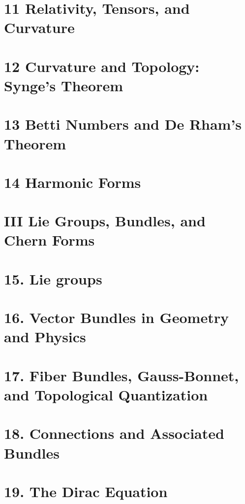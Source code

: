 \section{11 Relativity, Tensors, and Curvature}

\section{12 Curvature and Topology: Synge's Theorem}

\section{13 Betti Numbers and De Rham's Theorem}

\section{14 Harmonic Forms}

\section*{III Lie Groups, Bundles, and Chern Forms}


	\section{15. Lie groups}
		
	\section{16. Vector Bundles in Geometry and Physics}
		


\section{17. Fiber Bundles, Gauss-Bonnet, and Topological Quantization  }




\section{18. Connections and Associated Bundles}





\section{19. The Dirac Equation}

